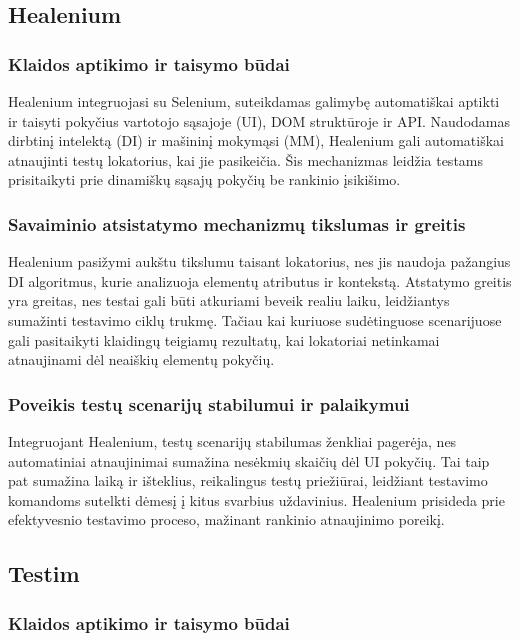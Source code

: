 \documentclass[
]{VUMIFPSkursinis}
\begin{document}
\subsection{Healenium}

\subsubsection{Klaidos aptikimo ir taisymo būdai}

Healenium integruojasi su Selenium, suteikdamas galimybę automatiškai aptikti ir taisyti pokyčius vartotojo sąsajoje (UI), DOM struktūroje ir API. Naudodamas dirbtinį intelektą (DI) ir mašininį mokymąsi (MM), Healenium gali automatiškai atnaujinti testų lokatorius, kai jie pasikeičia. Šis mechanizmas leidžia testams prisitaikyti prie dinamiškų sąsajų pokyčių be rankinio įsikišimo.

\subsubsection{Savaiminio atsistatymo mechanizmų tikslumas ir greitis}

Healenium pasižymi aukštu tikslumu taisant lokatorius, nes jis naudoja pažangius DI algoritmus, kurie analizuoja elementų atributus ir kontekstą. Atstatymo greitis yra greitas, nes testai gali būti atkuriami beveik realiu laiku, leidžiantys sumažinti testavimo ciklų trukmę. Tačiau kai kuriuose sudėtinguose scenarijuose gali pasitaikyti klaidingų teigiamų rezultatų, kai lokatoriai netinkamai atnaujinami dėl neaiškių elementų pokyčių.

\subsubsection{Poveikis testų scenarijų stabilumui ir palaikymui}

Integruojant Healenium, testų scenarijų stabilumas ženkliai pagerėja, nes automatiniai atnaujinimai sumažina nesėkmių skaičių dėl UI pokyčių. Tai taip pat sumažina laiką ir išteklius, reikalingus testų priežiūrai, leidžiant testavimo komandoms sutelkti dėmesį į kitus svarbius uždavinius. Healenium prisideda prie efektyvesnio testavimo proceso, mažinant rankinio atnaujinimo poreikį.

\subsection{Testim}

\subsubsection{Klaidos aptikimo ir taisymo būdai}
\end{document}
